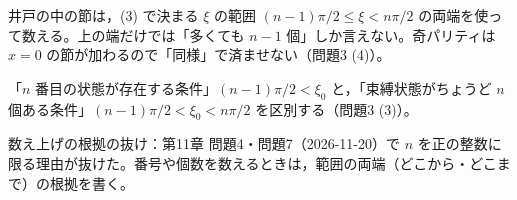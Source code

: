\documentclass[uplatex,dvipdfmx,a4paper,11pt]{jsarticle}
\begin{document}
\matome
\begin{saitenichiran}
\end{saitenichiran}
\begin{daiji}
  \item 井戸の中の節は，(3) で決まる $\xi$ の範囲 $(n-1)\pi/2\le\xi<n\pi/2$ の両端を使って数える。上の端だけでは「多くても $n-1$ 個」しか言えない。奇パリティは $x=0$ の節が加わるので「同様」で済ませない（問題3 (4)）。
  \item 「$n$ 番目の状態が存在する条件」$(n-1)\pi/2<\xi_{0}$ と，「束縛状態がちょうど $n$ 個ある条件」$(n-1)\pi/2<\xi_{0}<n\pi/2$ を区別する（問題3 (3)）。
\end{daiji}
\begin{maemo}
  \item 数え上げの根拠の抜け：第11章 問題4・問題7（2026-11-20）で $n$ を正の整数に限る理由が抜けた。番号や個数を数えるときは，範囲の両端（どこから・どこまで）の根拠を書く。
\end{maemo}
\end{document}

